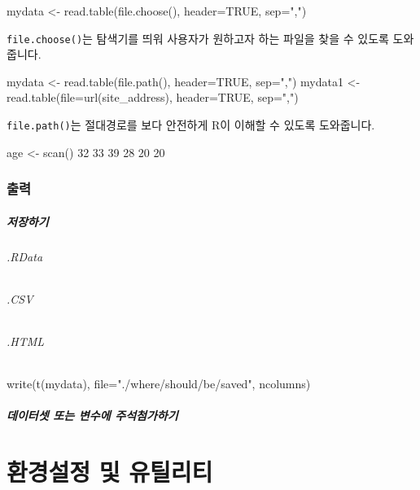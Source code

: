\begin{Schunk}
\begin{Soutput}
mydata <- read.table(file.choose(), header=TRUE, sep=",")
\end{Soutput}
\end{Schunk}

\texttt{file.choose()}는 탐색기를 띄워 사용자가 원하고자 하는 파일을 찾을 수 있도록 도와줍니다. 

\begin{Schunk}
\begin{Soutput}
mydata <- read.table(file.path(), header=TRUE, sep=",")
mydata1 <- read.table(file=url(site_address), header=TRUE, sep=",")
\end{Soutput}
\end{Schunk}

\texttt{file.path()}는 절대경로를 보다 안전하게 R이 이해할 수 있도록 도와줍니다. 



\begin{Schunk}
\begin{Soutput}
age <- scan()
32 33 39 28 20 20
\end{Soutput}
\end{Schunk}


\subsection{출력}

\paragraph{저장하기}
\subparagraph{.RData}
\subparagraph{.CSV}
\subparagraph{.HTML}
\begin{Schunk}
\begin{Soutput}
write(t(mydata), file="./where/should/be/saved", ncolumns)
\end{Soutput}
\end{Schunk}

\paragraph{데이터셋 또는 변수에 주석첨가하기}






\chapter{환경설정 및 유틸리티}

